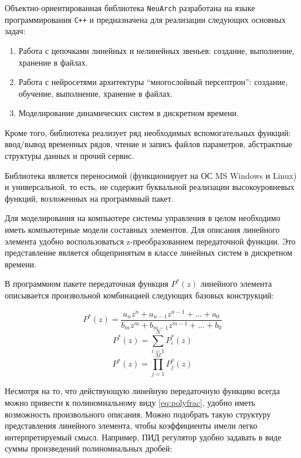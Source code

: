 Объектно-ориентированная библиотека {\tt NeuArch} разработана на языке
программирования {\tt C++} и предназначена для реализации следующих
основных задач:
\begin{enumerate}
\item Работа с цепочками линейных и нелинейных звеньев: создание,
  выполнение, хранение в файлах.
\item Работа с нейросетями архитектуры ``многослойный персептрон'':
  создание, обучение, выполнение, хранение в файлах.
\item Моделирование динамических систем в дискретном времени.
\end{enumerate}

Кроме того, библиотека реализует ряд необходимых вспомогательных
функций: ввод/вывод временных рядов, чтение и запись файлов
параметров, абстрактные структуры данных и прочий сервис.

Библиотека является переносимой (функционирует на ОС MS Windows и
Linux) и универсальной, то есть, не содержит буквальной реализации
высокоуровневых функций, возложенных на программный пакет.


Для моделирования на компьютере системы управления в целом необходимо
иметь компьютерные модели составных элементов.  Для описания линейного
элемента удобно воспользоваться z-преобразованием передаточной
функции.  Это представление является общепринятым в классе линейных
систем в дискретном времени.

В программном пакете передаточная функция $P^*(z)$ линейного элемента
описывается произвольной комбинацией следующих базовых конструкций:

\begin{equation}\label{eq:polyfrac}
P^*(z)=\frac{a_nz^n+a_{n-1}z^{n-1}+...+a_0}{b_mz^m+b_{m-1}z^{m-1}+...+b_0}
\end{equation}
\begin{equation}\label{eq:sum}
P^*(z)=\sum\limits_{i=1}^NP^*_i(z)
\end{equation}
\begin{equation}\label{eq:product}
P^*(z)=\prod\limits_{j=1}^MP^*_j(z)
\end{equation}

Несмотря на то, что действующую линейную передаточную функцию всегда
можно привести к полиномиальному виду \ref{eq:polyfrac}, удобно иметь
возможность произвольного описания.  Можно подобрать такую структуру
представления линейного элемента, чтобы коэффициенты имели легко
интерпретируемый смысл.  Например, ПИД регулятор удобно задавать в
виде суммы произведений полиномиальных дробей:

